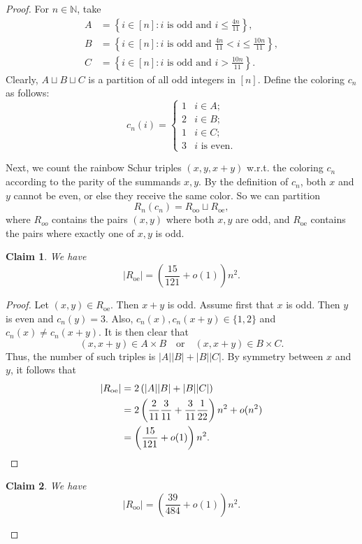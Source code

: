 \documentclass[10pt,a4paper]{amsart}
\newtheorem{claim}{Claim}
\begin{document}
\begin{proof}
For $n\in \mathbb{N}$, take
\begin{align*}
A& =\left\{i\in[n]: i\text{ is odd and }i\leq\frac{4n}{11}\right\},\\
B& =\left\{i\in[n]: i\text{ is odd and }
\frac{4n}{11}<i\leq\frac{10n}{11}\right\},\\
C&=\left\{i\in[n]: i\text{ is odd and }i>\frac{10n}{11}\right\}.
\end{align*}
Clearly, $A\sqcup B\sqcup C$ is a partition of all odd integers in $[n]$. Define the coloring $c_n$ as follows:
\[
c_n(i)=
\begin{cases}
1 & i\in A;\\
2 & i\in B;\\
1 & i\in C;\\
3 &  i \text{ is even}.
\end{cases}
\]

Next, we count the rainbow Schur triples $(x,y,x+y)$ w.r.t. the coloring $c_n$ according to the parity of the summands $x,y$. By the definition of $c_n$, both $x$ and $y$ cannot be even, or else they receive the same color. So we can partition
\[ R_n(c_n) = R_{\mathrm{oo}} \sqcup R_{\mathrm{oe}},\]
where $R_{oo}$ contains the pairs $(x,y)$ where both $x,y$ are odd, and $R_{\mathrm{oe}}$ contains the pairs where exactly one of $x,y$ is odd. 

\begin{claim}\label{claim:R_oe} We have 
\[|R_{\mathrm{oe}}| = \left(\frac{15}{121}+o(1)\right)n^2.\]
\end{claim}

\begin{proof}
Let $(x,y)\in R_{\mathrm{oe}}$. Then $x+y$ is odd. Assume first that $x$ is odd. Then $y$ is even and $c_n(y)=3$. Also, $c_n(x), c_n(x+y)\in \{1,2\}$ and $c_n(x)\neq c_n(x+y)$. It is then clear that 
\[ (x,x+y)\in A\times B \quad \text{or} \quad (x,x+y)\in B\times C.\]
Thus, the number of such triples is $|A||B| + |B||C|$. By symmetry between $x$ and $y$, it follows that 
\begin{align*}
    |R_{\mathrm{oe}}| & = 2\left(|A||B| + |B||C|\right)\\
    & = 2\left(\frac{2}{11}\frac{3}{11}+\frac{3}{11}\frac{1}{22}\right)n^2+o(n^2)\\
    &=\left(\frac{15}{121}+o(1)\right)n^2.\qedhere
\end{align*}
\end{proof}

\begin{claim}\label{claim:R_oo} We have 
\[|R_{\mathrm{oo}}| = \left(\frac{39}{484}+o(1)\right)n^2.\]
\end{claim}


\end{proof}
\end{document}

